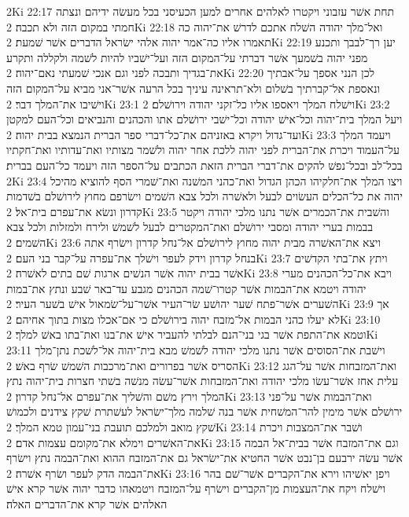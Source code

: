 2Ki 22:17  תחת אשׁר עזבוני ויקטרו לאלהים אחרים למען הכעיסני בכל מעשׂה ידיהם ונצתה חמתי במקום הזה ולא תכבה׃
2Ki 22:18  ואל־מלך יהודה השׁלח אתכם לדרשׁ את־יהוה כה תאמרו אליו כה־אמר יהוה אלהי ישׂראל הדברים אשׁר שׁמעת׃
2Ki 22:19  יען רך־לבבך ותכנע מפני יהוה בשׁמעך אשׁר דברתי על־המקום הזה ועל־ישׁביו להיות לשׁמה ולקללה ותקרע את־בגדיך ותבכה לפני וגם אנכי שׁמעתי נאם־יהוה׃
2Ki 22:20  לכן הנני אספך על־אבתיך ונאספת אל־קברתיך בשׁלום ולא־תראינה עיניך בכל הרעה אשׁר־אני מביא על־המקום הזה וישׁיבו את־המלך דבר׃
2Ki 23:1  וישׁלח המלך ויאספו אליו כל־זקני יהודה וירושׁלם׃
2Ki 23:2  ויעל המלך בית־יהוה וכל־אישׁ יהודה וכל־ישׁבי ירושׁלם אתו והכהנים והנביאים וכל־העם למקטן ועד־גדול ויקרא באזניהם את־כל־דברי ספר הברית הנמצא בבית יהוה׃
2Ki 23:3  ויעמד המלך על־העמוד ויכרת את־הברית לפני יהוה ללכת אחר יהוה ולשׁמר מצותיו ואת־עדותיו ואת־חקתיו בכל־לב ובכל־נפשׁ להקים את־דברי הברית הזאת הכתבים על־הספר הזה ויעמד כל־העם בברית׃
2Ki 23:4  ויצו המלך את־חלקיהו הכהן הגדול ואת־כהני המשׁנה ואת־שׁמרי הסף להוציא מהיכל יהוה את כל־הכלים העשׂוים לבעל ולאשׁרה ולכל צבא השׁמים וישׂרפם מחוץ לירושׁלם בשׁדמות קדרון ונשׂא את־עפרם בית־אל׃
2Ki 23:5  והשׁבית את־הכמרים אשׁר נתנו מלכי יהודה ויקטר בבמות בערי יהודה ומסבי ירושׁלם ואת־המקטרים לבעל לשׁמשׁ ולירח ולמזלות ולכל צבא השׁמים׃
2Ki 23:6  ויצא את־האשׁרה מבית יהוה מחוץ לירושׁלם אל־נחל קדרון וישׂרף אתה בנחל קדרון וידק לעפר וישׁלך את־עפרה על־קבר בני העם׃
2Ki 23:7  ויתץ את־בתי הקדשׁים אשׁר בבית יהוה אשׁר הנשׁים ארגות שׁם בתים לאשׁרה׃
2Ki 23:8  ויבא את־כל־הכהנים מערי יהודה ויטמא את־הבמות אשׁר קטרו־שׁמה הכהנים מגבע עד־באר שׁבע ונתץ את־במות השׁערים אשׁר־פתח שׁער יהושׁע שׂר־העיר אשׁר־על־שׂמאול אישׁ בשׁער העיר׃
2Ki 23:9  אך לא יעלו כהני הבמות אל־מזבח יהוה בירושׁלם כי אם־אכלו מצות בתוך אחיהם׃
2Ki 23:10  וטמא את־התפת אשׁר בגי בני־הנם לבלתי להעביר אישׁ את־בנו ואת־בתו באשׁ למלך׃
2Ki 23:11  וישׁבת את־הסוסים אשׁר נתנו מלכי יהודה לשׁמשׁ מבא בית־יהוה אל־לשׁכת נתן־מלך הסריס אשׁר בפרורים ואת־מרכבות השׁמשׁ שׂרף באשׁ׃
2Ki 23:12  ואת־המזבחות אשׁר על־הגג עלית אחז אשׁר־עשׂו מלכי יהודה ואת־המזבחות אשׁר־עשׂה מנשׁה בשׁתי חצרות בית־יהוה נתץ המלך וירץ משׁם והשׁליך את־עפרם אל־נחל קדרון׃
2Ki 23:13  ואת־הבמות אשׁר על־פני ירושׁלם אשׁר מימין להר־המשׁחית אשׁר בנה שׁלמה מלך־ישׂראל לעשׁתרת שׁקץ צידנים ולכמושׁ שׁקץ מואב ולמלכם תועבת בני־עמון טמא המלך׃
2Ki 23:14  ושׁבר את־המצבות ויכרת את־האשׁרים וימלא את־מקומם עצמות אדם׃
2Ki 23:15  וגם את־המזבח אשׁר בבית־אל הבמה אשׁר עשׂה ירבעם בן־נבט אשׁר החטיא את־ישׂראל גם את־המזבח ההוא ואת־הבמה נתץ וישׂרף את־הבמה הדק לעפר ושׂרף אשׁרה׃
2Ki 23:16  ויפן יאשׁיהו וירא את־הקברים אשׁר־שׁם בהר וישׁלח ויקח את־העצמות מן־הקברים וישׂרף על־המזבח ויטמאהו כדבר יהוה אשׁר קרא אישׁ האלהים אשׁר קרא את־הדברים האלה׃
